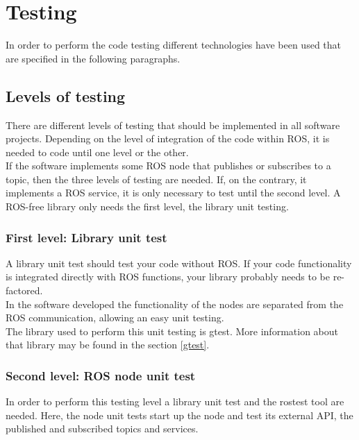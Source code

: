 \section{Testing}
\label{testing}
In order to perform the code testing different technologies have been used that are specified in the following paragraphs. 
\\


\subsection {Levels of testing}

There are different levels of testing that should be implemented in all software projects. Depending on the level of integration of the code within ROS, it is needed to code until one level or the other. 		\\

If the software implements some ROS node that publishes or subscribes to a topic, then the three levels of testing are needed. If, on the contrary, it implements a ROS service, it is only necessary to test until the second level. A ROS-free library only needs the first level, the library unit testing. 

	\subsubsection{First level: Library unit test}
A library unit test should test your code without ROS. If your code functionality is integrated directly with ROS functions, your library probably needs to be re-factored. 
\\

In the software developed the functionality of the nodes are separated from the ROS communication, allowing an easy unit testing. \\

The library used to perform this unit testing is gtest. More information about that library may be found in the section \ref{gtest}.

	\subsubsection{Second level: ROS node unit test}
In order to perform this testing level a library unit test and the rostest tool are needed. Here, the node unit tests start up the node and test its external API, the published and subscribed topics and services. 
\\

